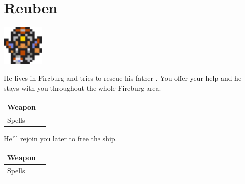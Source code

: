 \section{Reuben}
\label{char:reuben}

\includegraphics[height=2cm,keepaspectratio]{./resources/chars/reuben}

He lives in Fireburg and tries to rescue his father . You offer your help and he stays with you throughout the whole Fireburg area.

\vspace{0.5em}
\begin{tabular}{ l | l }
	Weapon & \nameref{weapon:morning_star} \\
	\hline
	Spells & \nameref{spell:life}
\end{tabular}
\vspace{0.5em}

\vspace{1em}

He’ll rejoin you later to free the ship.

\vspace{0.5em}
\begin{tabular}{ l | l }
	Weapon & \nameref{weapon:morning_star} \\
	\hline
	Spells & \nameref{spell:life} \\
	& \nameref{spell:white}
\end{tabular}
\vspace{0.5em}

